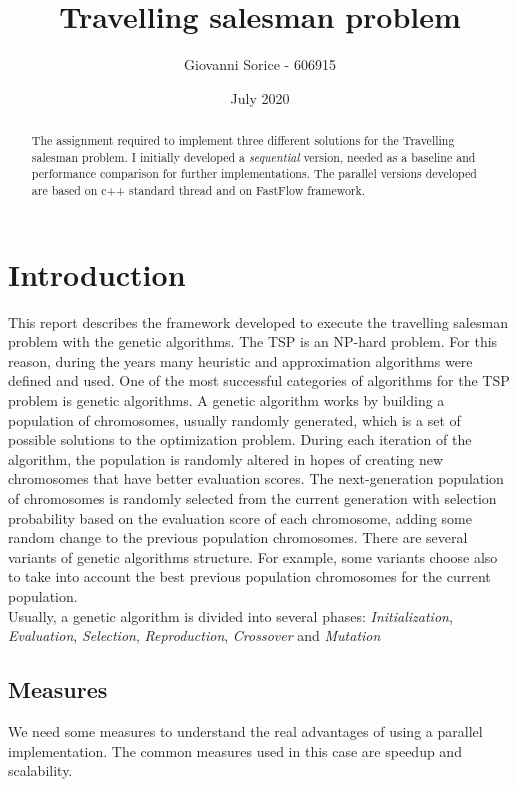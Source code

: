 \documentclass[a4paper,10pt]{article}
\title{Travelling salesman problem}
\author{Giovanni Sorice - 606915}
\date{July 2020}
\begin{document}
	

		\maketitle
		\begin{abstract}
			The assignment required to implement three different solutions for the Travelling salesman problem. I initially developed a \textit{sequential} version, needed as a baseline and performance comparison for further implementations. The parallel versions developed are based on c++ standard thread and on FastFlow framework.
		\end{abstract}

	
	\section{Introduction}
	This report describes the framework developed to execute the travelling salesman problem with the genetic algorithms.
	The TSP is an NP-hard problem. For this reason, during the years many heuristic and approximation algorithms were defined and used. One of the most successful categories of algorithms for the TSP problem is genetic algorithms.
	A genetic algorithm works by building a population of chromosomes, usually randomly generated, which is a set of possible solutions to the optimization problem. During each iteration of the algorithm, the population is randomly altered in hopes of creating new chromosomes that have better evaluation scores. The next-generation population of chromosomes is randomly selected from the current generation with selection probability based on the evaluation score of each chromosome, adding some random change to the previous population chromosomes. There are several variants of genetic algorithms structure. For example, some variants choose also to take into account the best previous population chromosomes for the current population.
	\\
	Usually, a genetic algorithm is divided into several phases: \textit{Initialization}, \textit{Evaluation}, \textit{Selection}, \textit{Reproduction}, \textit{Crossover}  and \textit{Mutation}


	\subsection{Measures}
	We need some measures to understand the real advantages of using a parallel implementation. The common measures used in this case are speedup and scalability.
\end{document}

